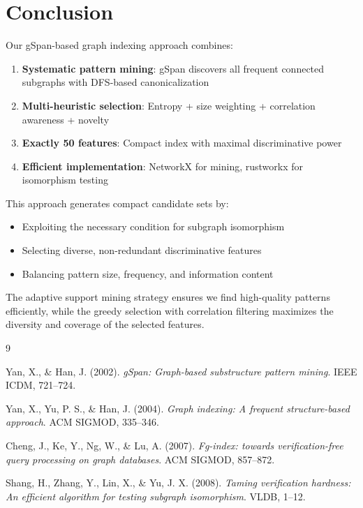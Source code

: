 \documentclass[12pt,a4paper]{article}
\begin{document}
\section{Conclusion}

Our gSpan-based graph indexing approach combines:
\begin{enumerate}
    \item \textbf{Systematic pattern mining}: gSpan discovers all frequent connected subgraphs with DFS-based canonicalization
    \item \textbf{Multi-heuristic selection}: Entropy + size weighting + correlation awareness + novelty
    \item \textbf{Exactly 50 features}: Compact index with maximal discriminative power
    \item \textbf{Efficient implementation}: NetworkX for mining, rustworkx for isomorphism testing
\end{enumerate}

This approach generates compact candidate sets by:
\begin{itemize}
    \item Exploiting the necessary condition for subgraph isomorphism
    \item Selecting diverse, non-redundant discriminative features
    \item Balancing pattern size, frequency, and information content
\end{itemize}

The adaptive support mining strategy ensures we find high-quality patterns efficiently, while the greedy selection with correlation filtering maximizes the diversity and coverage of the selected features.

\newpage
\begin{thebibliography}{9}

Yan, X., \& Han, J. (2002).
\textit{gSpan: Graph-based substructure pattern mining}.
IEEE ICDM, 721--724.

Yan, X., Yu, P. S., \& Han, J. (2004).
\textit{Graph indexing: A frequent structure-based approach}.
ACM SIGMOD, 335--346.

Cheng, J., Ke, Y., Ng, W., \& Lu, A. (2007).
\textit{Fg-index: towards verification-free query processing on graph databases}.
ACM SIGMOD, 857--872.

Shang, H., Zhang, Y., Lin, X., \& Yu, J. X. (2008).
\textit{Taming verification hardness: An efficient algorithm for testing subgraph isomorphism}.
VLDB, 1--12.

\end{thebibliography}
\end{document}
